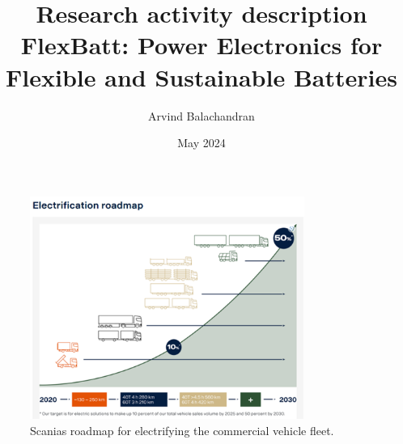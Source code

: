 \documentclass{article}
\title{\large Research activity description \\ \Large FlexBatt: Power Electronics for Flexible and Sustainable Batteries}
\author{Arvind Balachandran}
\date{May 2024}
\begin{document}
\maketitle

\begin{figure}[!b]
    \centering
    \includegraphics[width=0.8\textwidth]{Figures/EV_sales.png}
    \caption{Scanias roadmap for electrifying the commercial vehicle fleet.}
    \label{fig:EVsales}
\end{figure}
\end{document}
